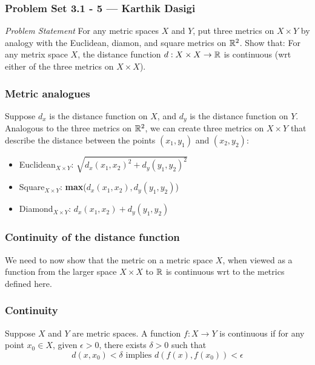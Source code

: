 
\begin{frame}
    \frametitle{Problem Set 3.1 - 5 --- Karthik Dasigi}
    \emph{Problem Statement}
    For any metric spaces \(X\) and \(Y\), put three metrics on \(X \times Y\)
    by analogy with the Euclidean, diamon, and square metrics on \(\mathbb{R}^2\).
    Show that: For any metrix space \(X\), the distance function \(d: X \times X
    \to \mathbb{R}\) is continuous (wrt either of the three metrics on \(X \times
    X\)).
\end{frame}

\begin{frame}
    \frametitle{Metric analogues}

    Suppose \(d_x\) is the distance function on \(X\), and \(d_y\) is the distance function on \(Y\).
    Analogous to the three metrics on \(\mathbb{R}^2\), we can create three metrics on \(X\times Y\) that
    describe the distance between the points \((x_1, y_1)\) and \((x_2, y_2)\):
    \begin{itemize}
        \item Euclidean\(_{X\times Y}\): \(\sqrt{d_x(x_1, x_2)^2 + d_y(y_1, y_2)^2}\)
        \item Square\(_{X\times Y}\): \textbf{max}(\(d_x(x_1, x_2) , d_y(y_1, y_2)\))
        \item Diamond\(_{X\times Y}\): \(d_x(x_1, x_2) + d_y(y_1, y_2)\)
    \end{itemize}

\end{frame}

\begin{frame}
    \frametitle{Continuity of the distance function}

    We need to now show that the metric on a metric space \(X\), when viewed as
    a function from the larger space \(X\times X\) to \(\mathbb{R}\) is continuous
    wrt to the metrics defined here. 

\end{frame}

\begin{frame}

    \frametitle{Continuity}

    \begin{definition}[Continuity]
        Suppose \(X\) and \(Y\) are metric spaces. A function \(f : X \rightarrow Y\)
        is continuous if for any point \(x_0 \in X\), given \(\epsilon > 0\),
        there exists \(\delta > 0\) such that
        \begin{equation}
            d(x,x_0)<\delta \text{ implies } d(f(x), f(x_0))<\epsilon 
        \end{equation}

    \end{definition}
    
\end{frame}

